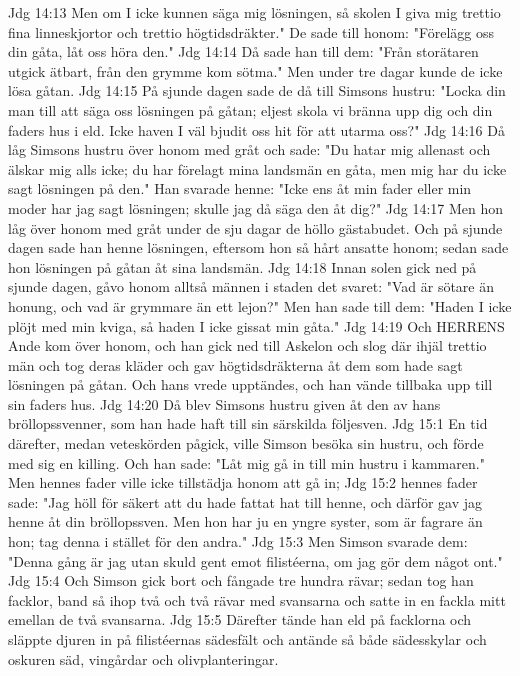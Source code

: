 Jdg 14:13  Men om I icke kunnen säga mig lösningen, så skolen I giva mig trettio fina linneskjortor och trettio högtidsdräkter." De sade till honom: "Förelägg oss din gåta, låt oss höra den."
Jdg 14:14  Då sade han till dem: "Från storätaren utgick ätbart, från den grymme kom sötma." Men under tre dagar kunde de icke lösa gåtan.
Jdg 14:15  På sjunde dagen sade de då till Simsons hustru: "Locka din man till att säga oss lösningen på gåtan; eljest skola vi bränna upp dig och din faders hus i eld. Icke haven I väl bjudit oss hit för att utarma oss?"
Jdg 14:16  Då låg Simsons hustru över honom med gråt och sade: "Du hatar mig allenast och älskar mig alls icke; du har förelagt mina landsmän en gåta, men mig har du icke sagt lösningen på den." Han svarade henne: "Icke ens åt min fader eller min moder har jag sagt lösningen; skulle jag då säga den åt dig?"
Jdg 14:17  Men hon låg över honom med gråt under de sju dagar de höllo gästabudet. Och på sjunde dagen sade han henne lösningen, eftersom hon så hårt ansatte honom; sedan sade hon lösningen på gåtan åt sina landsmän.
Jdg 14:18  Innan solen gick ned på sjunde dagen, gåvo honom alltså männen i staden det svaret: "Vad är sötare än honung, och vad är grymmare än ett lejon?" Men han sade till dem: "Haden I icke plöjt med min kviga, så haden I icke gissat min gåta."
Jdg 14:19  Och HERRENS Ande kom över honom, och han gick ned till Askelon och slog där ihjäl trettio män och tog deras kläder och gav högtidsdräkterna åt dem som hade sagt lösningen på gåtan. Och hans vrede upptändes, och han vände tillbaka upp till sin faders hus.
Jdg 14:20  Då blev Simsons hustru given åt den av hans bröllopssvenner, som han hade haft till sin särskilda följesven.
Jdg 15:1  En tid därefter, medan veteskörden pågick, ville Simson besöka sin hustru, och förde med sig en killing. Och han sade: "Låt mig gå in till min hustru i kammaren." Men hennes fader ville icke tillstädja honom att gå in;
Jdg 15:2  hennes fader sade: "Jag höll för säkert att du hade fattat hat till henne, och därför gav jag henne åt din bröllopssven. Men hon har ju en yngre syster, som är fagrare än hon; tag denna i stället för den andra."
Jdg 15:3  Men Simson svarade dem: "Denna gång är jag utan skuld gent emot filistéerna, om jag gör dem något ont."
Jdg 15:4  Och Simson gick bort och fångade tre hundra rävar; sedan tog han facklor, band så ihop två och två rävar med svansarna och satte in en fackla mitt emellan de två svansarna.
Jdg 15:5  Därefter tände han eld på facklorna och släppte djuren in på filistéernas sädesfält och antände så både sädesskylar och oskuren säd, vingårdar och olivplanteringar.
